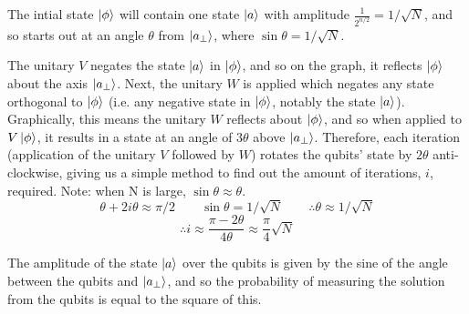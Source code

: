 \documentclass[a4paper,10pt, titlepage, twoside]{article}
\begin{document}
\begin{figure}
\centering
{}
\end{figure}

The intial state $\ket{\phi}$ will contain one state $\ket{a}$ with amplitude $\frac{1}{2^{n/2}} = 1 / \sqrt{N}$, and so starts out at an angle $\theta$ from $\ket{a_\perp}$, where $\sin{\theta} = 1 / \sqrt{N}$.\par
The unitary $V$ negates the state $\ket{a}$ in $\ket{\phi}$, and so on the graph, it reflects $\ket{\phi}$ about the axis $\ket{a_\perp}$. Next, the unitary $W$ is applied which negates any state orthogonal to $\ket{\phi}$ (i.e. any negative state in $\ket{\phi}$, notably the state $\ket{a}$). Graphically, this means the unitary $W$ reflects about $\ket{\phi}$, and so when applied to $V\ket{\phi}$, it results in a state at an angle of $3\theta$ above $\ket{a_\perp}$. Therefore, each iteration (application of the unitary $V$ followed by $W$) rotates the qubits' state by $2\theta$ anti-clockwise, giving us a simple method to find out the amount of iterations, $i$, required. Note: when N is large, $\sin{\theta} \approx \theta$.
$$\theta + 2i\theta \approx \pi / 2  \qquad \sin{\theta} = 1 / \sqrt{N} \qquad \therefore \theta \approx 1 / \sqrt{N}$$ 
$$\therefore i \approx \frac{\pi - 2\theta}{4\theta} \approx \frac{\pi}{4} \sqrt{N}$$
\par
The amplitude of the state $\ket{a}$ over the qubits is given by the sine of the angle between the qubits and $\ket{a_\perp}$, and so the probability of measuring the solution from the qubits is equal to the square of this.
\end{document}

